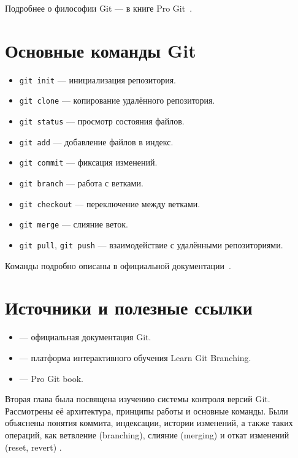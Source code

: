 \documentclass[a4paper,12pt]{report}
\begin{document}
Подробнее о философии Git — в книге Pro Git~\cite{progit_book}.

\section{Основные команды Git}
\begin{itemize}[noitemsep]
    \item \texttt{git init} — инициализация репозитория.
    \item \texttt{git clone} — копирование удалённого репозитория.
    \item \texttt{git status} — просмотр состояния файлов.
    \item \texttt{git add} — добавление файлов в индекс.
    \item \texttt{git commit} — фиксация изменений.
    \item \texttt{git branch} — работа с ветками.
    \item \texttt{git checkout} — переключение между ветками.
    \item \texttt{git merge} — слияние веток.
    \item \texttt{git pull}, \texttt{git push} — взаимодействие с удалёнными репозиториями.
\end{itemize}

Команды подробно описаны в официальной документации~\cite{git_official_doc}.

\section{Источники и полезные ссылки}
\begin{itemize}[noitemsep]
    \item \cite{git_official_doc} — официальная документация Git.
    \item \cite{learngitbranching} — платформа интерактивного обучения Learn Git Branching.
    \item \cite{progit_book} — Pro Git book.
\end{itemize}


Вторая глава была посвящена изучению системы контроля версий Git. Рассмотрены её архитектура, принципы работы и основные команды. Были объяснены понятия коммита, индексации, истории изменений, а также таких операций, как ветвление (branching), слияние (merging) и откат изменений (reset, revert) \cite{progit_book, git_official_doc}.
\end{document}
